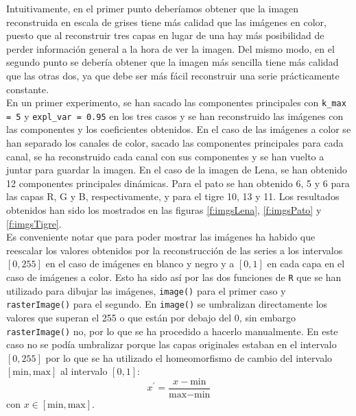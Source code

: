 Intuitivamente, en el primer punto deberíamos obtener que la imagen reconstruida en escala de grises tiene más calidad que las imágenes en color, puesto que al reconstruir tres capas en lugar de una hay más posibilidad de perder información general a la hora de ver la imagen. Del mismo modo, en el segundo punto se debería obtener que la imagen más sencilla tiene más calidad que las otras dos, ya que debe ser más fácil reconstruir una serie prácticamente constante.\\ %

En un primer experimento, se han sacado las componentes principales con \texttt{k\_max = 5} y \texttt{expl\_var = 0.95} en los tres casos y se han reconstruido las imágenes con las componentes y los coeficientes obtenidos. En el caso de las imágenes a color se han separado los canales de color, sacado las componentes principales para cada canal, se ha reconstruido cada canal con sus componentes y se han vuelto a juntar para guardar la imagen. En el caso de la imagen de Lena, se han obtenido 12 componentes principales dinámicas. Para el pato se han obtenido 6, 5 y 6 para las capas R, G y B, respectivamente, y para el tigre 10, 13 y 11. Los resultados obtenidos han sido los mostrados en las figuras \ref{f:imgsLena}, \ref{f:imgsPato} y \ref{f:imgsTigre}.\\

Es conveniente notar que para poder mostrar las imágenes ha habido que reescalar los valores obtenidos por la reconstrucción de las series a los intervalos $[0,255]$ en el caso de imágenes en blanco y negro y a $[0,1]$ en cada capa en el caso de imágenes a color. Esto ha sido así por las dos funciones de \texttt{R} que se han utilizado para dibujar las imágenes, \texttt{image()} para el primer caso y \texttt{rasterImage()} para el segundo. En \texttt{image()} se umbralizan directamente los valores que superan el 255 o que están por debajo del 0, sin embargo \texttt{rasterImage()} no, por lo que se ha procedido a hacerlo manualmente. En este caso no se podía umbralizar porque las capas originales estaban en el intervalo $[0,255]$ por lo que se ha utilizado el homeomorfismo de cambio del intervalo $[\text{min},\text{max}]$ al intervalo $[0,1]$:
\[	x^{'} = \frac{x - \text{min}}{\text{max}-\text{min}} 	\]
con $x \in [\text{min},\text{max}]$.

